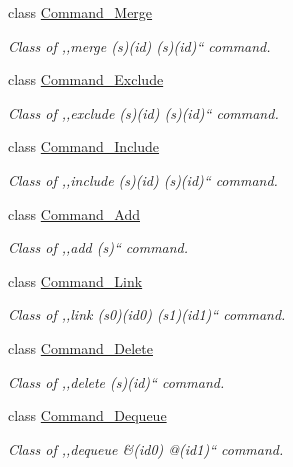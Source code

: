 \begin{DoxyCompactItemize}
class \hyperlink{classuiconsole_1_1Command__Merge}{Command\_\-Merge}
\begin{DoxyCompactList}\small\item\em Class of ,,merge (s)(id) (s)(id)`` command. \item\end{DoxyCompactList}\item 
class \hyperlink{classuiconsole_1_1Command__Exclude}{Command\_\-Exclude}
\begin{DoxyCompactList}\small\item\em Class of ,,exclude (s)(id) (s)(id)`` command. \item\end{DoxyCompactList}\item 
class \hyperlink{classuiconsole_1_1Command__Include}{Command\_\-Include}
\begin{DoxyCompactList}\small\item\em Class of ,,include (s)(id) (s)(id)`` command. \item\end{DoxyCompactList}\item 
class \hyperlink{classuiconsole_1_1Command__Add}{Command\_\-Add}
\begin{DoxyCompactList}\small\item\em Class of ,,add (s)`` command. \item\end{DoxyCompactList}\item 
class \hyperlink{classuiconsole_1_1Command__Link}{Command\_\-Link}
\begin{DoxyCompactList}\small\item\em Class of ,,link (s0)(id0) (s1)(id1)`` command. \item\end{DoxyCompactList}\item 
class \hyperlink{classuiconsole_1_1Command__Delete}{Command\_\-Delete}
\begin{DoxyCompactList}\small\item\em Class of ,,delete (s)(id)`` command. \item\end{DoxyCompactList}\item 
class \hyperlink{classuiconsole_1_1Command__Dequeue}{Command\_\-Dequeue}
\begin{DoxyCompactList}\small\item\em Class of ,,dequeue \&(id0) @(id1)`` command. \item\end{DoxyCompactList}\item 

\end{DoxyCompactItemize}
